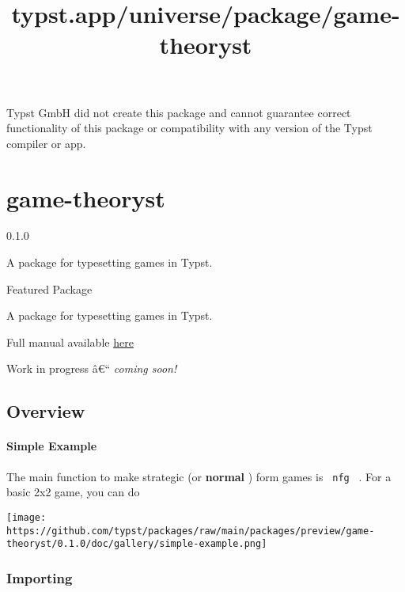 Typst GmbH did not create this package and cannot guarantee correct
functionality of this package or compatibility with any version of the
Typst compiler or app.


\title{typst.app/universe/package/game-theoryst}

\label{banner}
\section{game-theoryst}\label{game-theoryst}

{ 0.1.0 }

A package for typesetting games in Typst.

{ } Featured Package

\label{readme}
A package for typesetting games in Typst.

Full manual available
\href{https://github.com/typst/packages/raw/main/packages/preview/game-theoryst/0.1.0/doc/gtheoryst-manual.pdf}{here}

Work in progress â€`` \emph{coming soon!}

\subsection{Overview}\label{overview}

\paragraph{Simple Example}\label{simple-example}

The main function to make strategic (or \textbf{normal} ) form games is
\texttt{\ nfg\ } . For a basic 2x2 game, you can do

\begin{Shaded}
\begin{Highlighting}[]
\NormalTok{  [$10, 10$], [$2, 20$], }
\NormalTok{  [$20, 2$], [$5, 5$],}
\NormalTok{)}
\end{Highlighting}
\end{Shaded}

\texttt{[image: https://github.com/typst/packages/raw/main/packages/preview/game-theoryst/0.1.0/doc/gallery/simple-example.png]}

\subsubsection{Importing}\label{importing}

